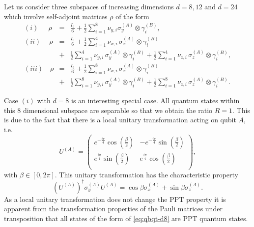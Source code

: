 \documentclass[12pt]{iopart}
\begin{document}
Let us consider three subspaces of increasing dimensions $d=8, 12$ and $d= 24$ which involve self-adjoint matrices $\rho$ of the form
\begin{eqnarray}
 (i) \ \ \quad \rho &=&\frac{I_6}{6}+\frac{1}{2}\sum_{i=1}^8 \nu_{y,i} \sigma^{(A)}_y \otimes \gamma^{(B)}_i \label{eq:qbqt-d8}, \\
 (ii) \  \quad \rho &=&\frac{{I_6}}{6}+\frac{1}{2}\sum_{i=1}^4 \nu_{x,i}\,\sigma^{(A)}_x \otimes \gamma^{(B)}_i \label{eq:qbqt-d12} \\
       &+& \frac{1}{2}\sum_{i=1}^4 \nu_{y,i}\,\sigma^{(A)}_y \otimes \gamma^{(B)}_i + \frac{1}{2}\sum_{i=1}^{4} \nu_{z,i}\,\sigma^{(A)}_z \otimes \gamma^{(B)}_i, \nonumber \\
 (iii) \quad \rho &=&\frac{{I_6}}{6}+\frac{1}{2}\sum_{i=1}^8 \nu_{x,i}\,\sigma^{(A)}_x \otimes \gamma^{(B)}_i  \label{eq:qbqt-d24} \\
    &+& \frac{1}{2}\sum_{i=1}^8 \nu_{y,i}\,\sigma^{(A)}_y \otimes \gamma^{(B)}_i + \frac{1}{2}\sum_{i=1}^{8} \nu_{z,i}\,\sigma^{(A)}_z \otimes \gamma^{(B)}_i. \nonumber 
\end{eqnarray}

Case $(i)$ with $d=8$ is an 
interesting special case. All quantum states within this $8$ dimensional subspace are separable so that we obtain the ratio $R=1$. 
This is due to the fact that
there 
is a local unitary transformation acting on qubit $A$, i.e.
\begin{equation}
 U^{(A)}=\begin{pmatrix}
          e^{-\frac{i \pi }{4}} \cos \left(\frac{\beta}{2}\right) & -e^{-\frac{i \pi }{4}} \sin \left(\frac{\beta}{2}\right) \\
 e^{\frac{i \pi }{4}} \sin \left(\frac{\beta}{2}\right) & e^{\frac{i \pi }{4}} \cos \left(\frac{\beta}{2}\right) \\
         \end{pmatrix}, \nonumber
\end{equation}
with $\beta \in [0,2 \pi]$. This unitary transformation has the characteristic property
\begin{equation}
 \left(U^{(A)}\right)^\dagger \sigma^{(A)}_y U^{(A)}=\cos \beta \sigma^{(A)}_x + \sin \beta \sigma^{(A)}_z. \nonumber
\end{equation}
As a local unitary transformation does not change the PPT property it is apparent from the transformation properties of the Pauli matrices under transposition that all states of the form of \eqref{eq:qbqt-d8} are PPT quantum states.
\end{document}

